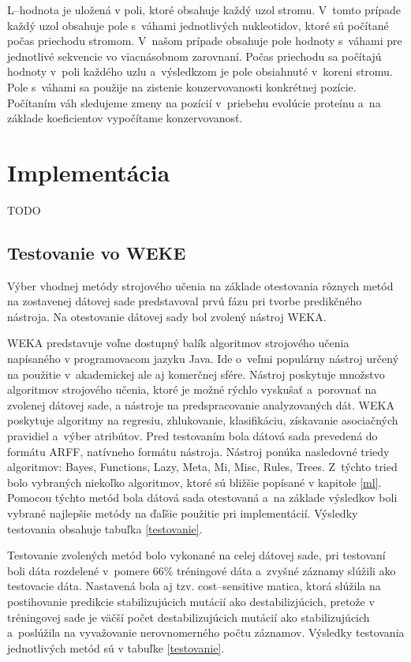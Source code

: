 L--hodnota je uložená v poli, ktoré obsahuje každý uzol stromu. V~tomto prípade každý uzol obsahuje pole s~váhami jednotlivých nukleotidov, ktoré sú počítané počas priechodu stromom. V~našom prípade obsahuje pole hodnoty s~váhami pre jednotlivé sekvencie vo viacnásobnom zarovnaní. Počas priechodu sa počítajú hodnoty v~poli každého uzlu a~výsledkzom je pole obsiahnuté v~koreni stromu. Pole s~váhami sa použije na zistenie konzervovanosti konkrétnej pozície. Počítaním váh sledujeme zmeny na pozícií v~priebehu evolúcie proteínu a~na základe koeficientov vypočítame konzervovanosť.

\chapter{Implementácia}
TODO
\section{Testovanie vo WEKE}
\label{wekatest}
Výber vhodnej metódy strojového učenia na základe otestovania rôznych metód na zostavenej dátovej sade predstavoval prvú fázu pri tvorbe predikčného nástroja. Na otestovanie dátovej sady bol zvolený nástroj WEKA.

WEKA \cite{weka} predstavuje voľne dostupný balík algoritmov strojového učenia napísaného v programovacom jazyku Java. Ide o~veľmi populárny nástroj určený na použitie v~akademickej ale aj komerčnej sfére. Nástroj poskytuje množstvo algoritmov strojového učenia, ktoré je možné rýchlo vyskušať a~porovnať na zvolenej dátovej sade, a nástroje na predspracovanie analyzovaných dát. WEKA poskytuje algoritmy na regresiu, zhlukovanie, klasifikáciu, získavanie asociačných pravidiel a~výber atribútov.
Pred testovaním bola dátová sada prevedená do formátu ARFF, natívneho formátu nástroja. Nástroj ponúka nasledovné triedy algoritmov: Bayes, Functions, Lazy, Meta, Mi, Misc, Rules, Trees. Z~týchto tried bolo vybraných niekoľko algoritmov, ktoré sú bližšie popísané v kapitole \ref{ml}. Pomocou týchto metód bola dátová sada otestovaná a~na základe výsledkov boli vybrané najlepšie metódy na ďaľšie použitie pri implementácií. Výsledky testovania obsahuje tabuľka \ref{testovanie}.

Testovanie zvolených metód bolo vykonané na celej dátovej sade, pri testovaní boli dáta rozdelené v~pomere 66\% tréningové dáta a~zvyšné záznamy slúžili ako testovacie dáta. Nastavená bola aj tzv. cost--sensitive matica, ktorá slúžila na postihovanie predikcie stabilizujúcich mutácií ako destabilizjúcich, pretože v tréningovej sade je väčší počet destabilizujúcich mutácií ako stabilizujúcich a~poslúžila na vyvažovanie nerovnomerného počtu záznamov. Výsledky testovania jednotlivých metód sú v tabuľke \ref{testovanie}. 

